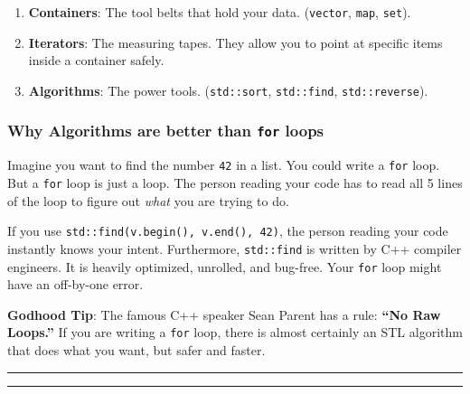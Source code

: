 \begin{enumerate}
\def\labelenumi{\arabic{enumi}.}
\tightlist
\item
  \textbf{Containers}: The tool belts that hold your data.
  (\passthrough{\lstinline!vector!}, \passthrough{\lstinline!map!},
  \passthrough{\lstinline!set!}).
\item
  \textbf{Iterators}: The measuring tapes. They allow you to point at
  specific items inside a container safely.
\item
  \textbf{Algorithms}: The power tools.
  (\passthrough{\lstinline!std::sort!},
  \passthrough{\lstinline!std::find!},
  \passthrough{\lstinline!std::reverse!}).
\end{enumerate}

\hypertarget{why-algorithms-are-better-than-for-loops}{%
\subsubsection{\texorpdfstring{Why Algorithms are better than
\texttt{for}
loops}{Why Algorithms are better than for loops}}\label{why-algorithms-are-better-than-for-loops}}

Imagine you want to find the number \passthrough{\lstinline!42!} in a
list. You could write a \passthrough{\lstinline!for!} loop. But a
\passthrough{\lstinline!for!} loop is just a loop. The person reading
your code has to read all 5 lines of the loop to figure out \emph{what}
you are trying to do.

If you use \passthrough{\lstinline!std::find(v.begin(), v.end(), 42)!},
the person reading your code instantly knows your intent. Furthermore,
\passthrough{\lstinline!std::find!} is written by C++ compiler
engineers. It is heavily optimized, unrolled, and bug-free. Your
\passthrough{\lstinline!for!} loop might have an off-by-one error.

\textbf{Godhood Tip}: The famous C++ speaker Sean Parent has a rule:
\textbf{``No Raw Loops.''} If you are writing a
\passthrough{\lstinline!for!} loop, there is almost certainly an STL
algorithm that does what you want, but safer and faster.

\begin{center}\rule{0.5\linewidth}{0.5pt}\end{center}

\begin{center}\rule{0.5\linewidth}{0.5pt}\end{center}
